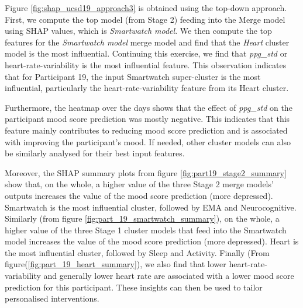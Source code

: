 Figure \ref{fig:shap_ucsd19_approach3} is obtained using the top-down approach. First, we compute the top model (from Stage 2) feeding into the Merge model using SHAP values, which is \emph{Smartwatch model}. We then compute the top features for the \emph{Smartwatch model} merge model and find that the \emph{Heart} cluster model is the most influential. Continuing this exercise, we find that \emph{ppg\_std} or heart-rate-variability is the most influential feature. This observation indicates that for Participant 19, the input Smartwatch super-cluster is the most influential, particularly the heart-rate-variability feature from its Heart cluster.

Furthermore, the heatmap over the days shows that the effect of \emph{ppg\_std} on the participant mood score prediction was mostly negative. This indicates that this feature mainly contributes to reducing mood score prediction and is associated with improving the participant's mood. If needed, other cluster models can also be similarly analysed for their best input features. 

Moreover, the SHAP summary plots from figure  \ref{fig:part19_stage2_summary} show that, on the whole, a higher value of the three Stage 2 merge models' outputs increases the value of the mood score prediction (more depressed). Smartwatch is the most influential cluster, followed by EMA and Neurocognitive. Similarly (from figure  \ref{fig:part_19_smartwatch_summary}),  on the whole, a higher value of the three Stage 1 cluster models that feed into the Smartwatch model increases the value of the mood score prediction (more depressed). Heart is the most influential cluster, followed by Sleep and Activity. Finally (From figure(\ref{fig:part_19_heart_summary}), we also find that lower heart-rate-variability and generally lower heart rate are associated with a lower mood score prediction for this participant. These insights can then be used to tailor personalised interventions. \newline



